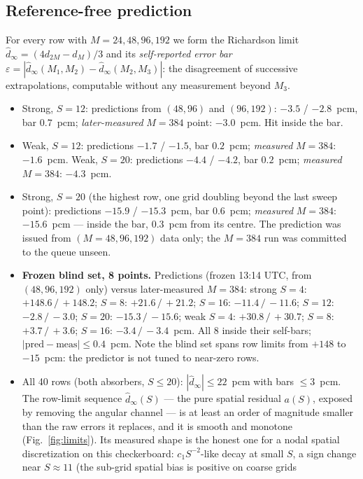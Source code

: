 \documentclass[11pt,a4paper]{article}
\begin{document}
\subsection{Reference-free prediction}
\label{sec:pred}
For every row with $M=24,48,96,192$ we form the Richardson limit
$\hat d_\infty = (4 d_{2M} - d_M)/3$ and its \emph{self-reported error
bar} $\varepsilon = |\hat d_\infty(M_1,M_2) -
\hat d_\infty(M_2,M_3)|$: the disagreement of successive
extrapolations, computable without any measurement beyond $M_3$.
\begin{itemize}
\item Strong, $S{=}12$: predictions from $(48,96)$ and $(96,192)$:
$-3.5$ / $-2.8$~pcm, bar $0.7$~pcm; \emph{later-measured} $M{=}384$
point: $-3.0$~pcm.  Hit inside the bar.
\item Weak, $S{=}12$: predictions $-1.7$ / $-1.5$, bar $0.2$~pcm;
\emph{measured} $M{=}384$: $-1.6$~pcm.  Weak, $S{=}20$: predictions
$-4.4$ / $-4.2$, bar $0.2$~pcm; \emph{measured} $M{=}384$: $-4.3$~pcm.
\item Strong, $S{=}20$ (the highest row, one grid doubling beyond the
last sweep point): predictions $-15.9$ / $-15.3$~pcm, bar $0.6$~pcm;
\emph{measured} $M{=}384$: $-15.6$~pcm --- inside the bar, $0.3$~pcm
from its centre.  The prediction was issued from $(M{=}48,96,192)$
data only; the $M{=}384$ run was committed to the queue unseen.
\item \textbf{Frozen blind set, 8 points.} Predictions
(frozen 13:14 UTC, from $(48,96,192)$ only) versus later-measured
$M{=}384$: strong $S=4$: $+148.6\,/\,+148.2$; $S=8$: $+21.6\,/\,
+21.2$; $S=16$: $-11.4\,/\,-11.6$; $S=12$: $-2.8\,/\,-3.0$;
$S=20$: $-15.3\,/\,-15.6$; weak $S=4$: $+30.8\,/\,+30.7$; $S=8$:
$+3.7\,/\,+3.6$; $S=16$: $-3.4\,/\,-3.4$~pcm. All 8 inside their
self-bars; $|\mathrm{pred}-\mathrm{meas}| \le 0.4$~pcm. Note the
blind set spans row limits from $+148$ to $-15$~pcm: the predictor
is not tuned to near-zero rows.
\item All 40 rows (both absorbers, $S\le20$):
$|\hat d_\infty| \le 22$~pcm with bars $\le 3$~pcm.  The row-limit
sequence $\hat d_\infty(S)$ --- the pure spatial residual $a(S)$,
exposed by removing the angular channel --- is at least an order of
magnitude smaller than the raw errors it replaces, and it is smooth
and monotone (Fig.~\ref{fig:limits}).  Its measured shape is the
honest one for a nodal spatial discretization on this checkerboard:
$c_1 S^{-2}$-like decay at small $S$, a sign change near
$S\approx11$ (the sub-grid spatial bias is positive on coarse grids

\end{itemize}
\end{document}
